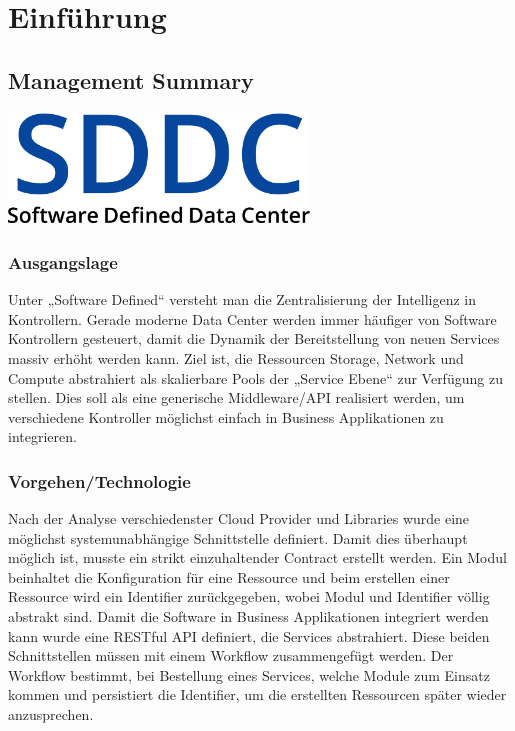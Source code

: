 \part{Einführung}
\chapter{Management Summary}
\begin{center}
  \includegraphics[width=0.6\textwidth]{./22_Grafiken/01_Logo/SDDC}
\end{center}
\section*{Ausgangslage}
Unter „Software Defined“ versteht man die Zentralisierung der Intelligenz in Kontrollern. Gerade moderne Data Center werden immer häufiger von Software Kontrollern gesteuert, damit die Dynamik der Bereitstellung von neuen Services massiv erhöht werden kann. 
Ziel ist, die Ressourcen Storage, Network und Compute abstrahiert als skalierbare Pools der „Service Ebene“ zur Verfügung zu stellen. Dies soll als eine generische Middleware/\ac{API} realisiert werden, um verschiedene Kontroller möglichst einfach in Business Applikationen zu integrieren.

\section*{Vorgehen/Technologie}
Nach der Analyse verschiedenster Cloud Provider und Libraries wurde eine möglichst systemunabhängige Schnittstelle definiert. Damit dies überhaupt möglich ist, musste ein strikt einzuhaltender Contract erstellt werden. Ein Modul beinhaltet die Konfiguration für eine \gls{Ressource} und beim erstellen einer \gls{Ressource} wird ein Identifier zurückgegeben, wobei Modul und Identifier völlig abstrakt sind. Damit die Software in Business Applikationen integriert werden kann wurde eine RESTful API definiert, die Services abstrahiert. Diese beiden Schnittstellen müssen mit einem \gls{Workflow} zusammengefügt werden. Der \gls{Workflow} bestimmt, bei Bestellung eines Services,  welche Module zum Einsatz kommen und persistiert die Identifier, um die erstellten Ressourcen später wieder anzusprechen.

